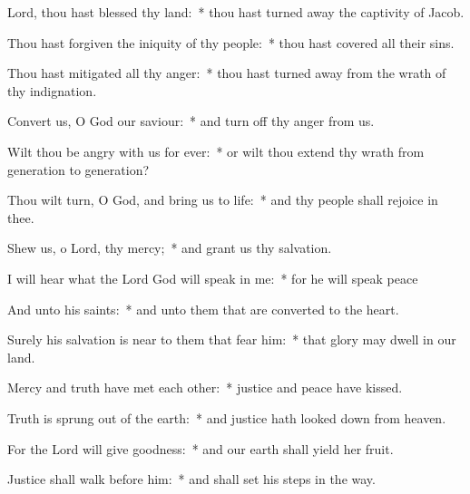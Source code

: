 \begin{enpars}
\item Lord, thou hast blessed thy land:~* thou hast turned away the captivity of Jacob.
\item Thou hast forgiven the iniquity of thy people:~* thou hast covered all their sins.
\item Thou hast mitigated all thy anger:~* thou hast turned away from the wrath of thy indignation.
\item Convert us, O God our saviour:~* and turn off thy anger from us.
\item Wilt thou be angry with us for ever:~* or wilt thou extend thy wrath from generation to generation?
\item Thou wilt turn, O God, and bring us to life:~* and thy people shall rejoice in thee.
\item Shew us, o Lord, thy mercy;~* and grant us thy salvation.
\item I will hear what the Lord God will speak in me:~* for he will speak peace
\item And unto his saints:~* and unto them that are converted to the heart.
\item Surely his salvation is near to them that fear him:~* that glory may dwell in our land.
\item Mercy and truth have met each other:~* justice and peace have kissed.
\item Truth is sprung out of the earth:~* and justice hath looked down from heaven.
\item For the Lord will give goodness:~* and our earth shall yield her fruit.
\item Justice shall walk before him:~* and shall set his steps in the way.
\end{enpars}
